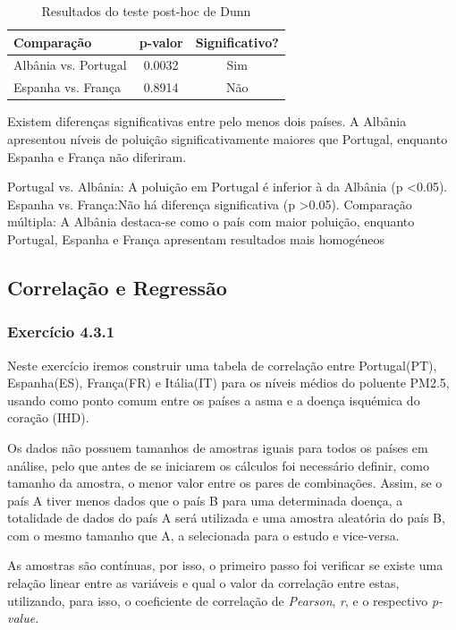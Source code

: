 \documentclass[conference]{IEEEtran}
\begin{document}
	\begin{table}[H]
		\centering
		\caption{Resultados do teste post-hoc de Dunn}
		\begin{tabular}{lcc}
			\toprule
			Comparação & p-valor & Significativo? \\
			\midrule
			Albânia vs. Portugal & 0.0032 & Sim \\
			Espanha vs. França & 0.8914 & Não \\
			\bottomrule
		\end{tabular}
	\end{table}

Existem diferenças significativas entre pelo menos dois países. A Albânia apresentou níveis de poluição significativamente maiores que Portugal, enquanto Espanha e França não diferiram. 

Portugal vs. Albânia: A poluição em Portugal é inferior à da Albânia (p \textless 0.05).
Espanha vs. França:Não há diferença significativa (p \textgreater 0.05).
Comparação múltipla: A Albânia destaca-se como o país com maior poluição, enquanto Portugal, Espanha e França apresentam resultados mais homogéneos

	
\subsection{Correlação e Regressão}\label{AA}

\subsubsection{\textbf{Exercício 4.3.1}}

Neste exercício iremos construir uma tabela de correlação entre Portugal(PT), Espanha(ES), França(FR) e Itália(IT) para os níveis médios do poluente PM2.5, usando como ponto comum entre os países a asma e a doença isquémica do coração (IHD).

Os dados não possuem tamanhos de amostras iguais para todos os países em análise, pelo que antes de se iniciarem os cálculos foi necessário definir, como tamanho da amostra, o menor valor entre os pares de combinações. Assim, se o país A tiver menos dados que o país B para uma determinada doença, a totalidade de dados do país A será utilizada e uma amostra aleatória do país B, com o mesmo tamanho que A, a selecionada para o estudo e vice-versa.

As amostras são contínuas, por isso, o primeiro passo foi verificar se existe uma relação linear entre as variáveis e qual o valor da correlação entre estas, utilizando, para isso, o coeficiente de correlação de \textit{Pearson}, \textit{r}, e o respectivo \textit{p-value}.
\end{document}
